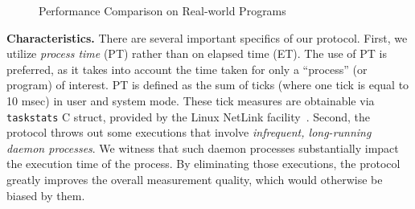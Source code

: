 \documentclass[letter]{ieice}
\begin{document}
\begin{figure}[t]
	\centering
	\caption{Performance Comparison on Real-world Programs~\label{fig:synprog_test}}
\vspace{-.3in}
\end{figure}

\vspace{-0.15in}
{\bf Characteristics.} There are several important specifics of our protocol. 
First, we utilize {\em process time} (PT) rather than on elapsed time (ET). 
The use of PT is preferred, as it takes into account 
the time taken for only a ``process'' (or program) of interest.
PT is defined as the sum of ticks (where one tick is equal to 10 msec)
in user and system mode. 
These tick measures are obtainable via {\tt taskstats} C struct, 
provided by the Linux NetLink facility~\cite{Netlink}. 
Second, the protocol throws out some executions that involve
{\em infrequent, \hbox{long-running} daemon processes}. 
We witness that such daemon processes substantially impact 
the execution time of the process.  
By eliminating those executions, the protocol greatly improves
the overall measurement quality, which would otherwise be biased by them.
\end{document}
